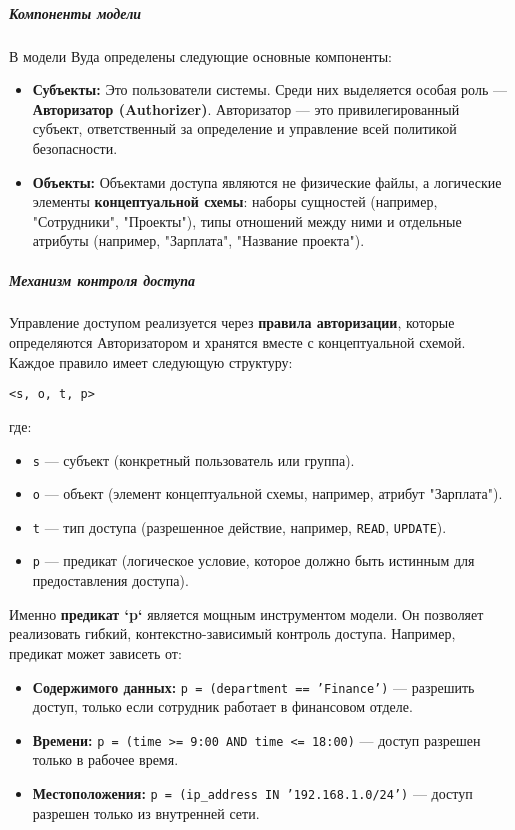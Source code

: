 \subparagraph{Компоненты модели}
В модели Вуда определены следующие основные компоненты:
\begin{itemize}
	\item \textbf{Субъекты:} Это пользователи системы. Среди них выделяется особая роль — \textbf{Авторизатор (Authorizer)}. Авторизатор — это привилегированный субъект, ответственный за определение и управление всей политикой безопасности.
	\item \textbf{Объекты:} Объектами доступа являются не физические файлы, а логические элементы \textbf{концептуальной схемы}: наборы сущностей (например, "Сотрудники", "Проекты"), типы отношений между ними и отдельные атрибуты (например, "Зарплата", "Название проекта").
\end{itemize}

\subparagraph{Механизм контроля доступа}
Управление доступом реализуется через \textbf{правила авторизации}, которые определяются Авторизатором и хранятся вместе с концептуальной схемой. Каждое правило имеет следующую структуру:
\begin{center}
	\texttt{<s, o, t, p>}
\end{center}
где:
\begin{itemize}
	\item \texttt{s} — субъект (конкретный пользователь или группа).
	\item \texttt{o} — объект (элемент концептуальной схемы, например, атрибут "Зарплата").
	\item \texttt{t} — тип доступа (разрешенное действие, например, \texttt{READ}, \texttt{UPDATE}).
	\item \texttt{p} — предикат (логическое условие, которое должно быть истинным для предоставления доступа).
\end{itemize}

Именно \textbf{предикат `p`} является мощным инструментом модели. Он позволяет реализовать гибкий, контекстно-зависимый контроль доступа. Например, предикат может зависеть от:
\begin{itemize}
	\item \textbf{Содержимого данных:} \texttt{p = (department == 'Finance')} — разрешить доступ, только если сотрудник работает в финансовом отделе.
	\item \textbf{Времени:} \texttt{p = (time >= 9:00 AND time <= 18:00)} — доступ разрешен только в рабочее время.
	\item \textbf{Местоположения:} \texttt{p = (ip\_address IN '192.168.1.0/24')} — доступ разрешен только из внутренней сети.
\end{itemize}

